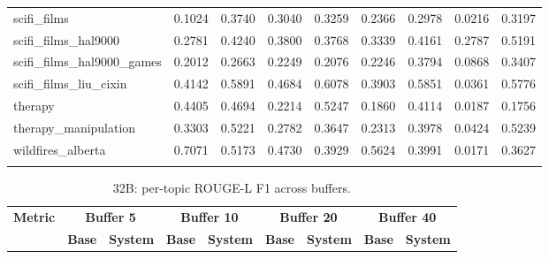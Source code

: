 \documentclass[pdflatex,sn-mathphys-num]{sn-jnl}%
\theoremstyle{thmstyleone}%
\theoremstyle{thmstyletwo}%
\theoremstyle{thmstylethree}%
\begin{document}
\begin{appendices}
\begin{landscape}
\begin{longtable}{@{}p{3.8cm}cccccccc@{}}
scifi\_films & 0.1024 & 0.3740 & 0.3040 & 0.3259 & 0.2366 & 0.2978 & 0.0216 & 0.3197 \\
scifi\_films\_hal9000 & 0.2781 & 0.4240 & 0.3800 & 0.3768 & 0.3339 & 0.4161 & 0.2787 & 0.5191 \\
scifi\_films\_hal9000\_games & 0.2012 & 0.2663 & 0.2249 & 0.2076 & 0.2246 & 0.3794 & 0.0868 & 0.3407 \\
scifi\_films\_liu\_cixin & 0.4142 & 0.5891 & 0.4684 & 0.6078 & 0.3903 & 0.5851 & 0.0361 & 0.5776 \\
therapy & 0.4405 & 0.4694 & 0.2214 & 0.5247 & 0.1860 & 0.4114 & 0.0187 & 0.1756 \\
therapy\_manipulation & 0.3303 & 0.5221 & 0.2782 & 0.3647 & 0.2313 & 0.3978 & 0.0424 & 0.5239 \\
wildfires\_alberta & 0.7071 & 0.5173 & 0.4730 & 0.3929 & 0.5624 & 0.3991 & 0.0171 & 0.3627 \\
\botrule
\end{longtable}
\normalsize
\end{landscape}
\begin{landscape}
\tiny
\begin{longtable}{@{}p{3.8cm}cccccccc@{}}
\caption{32B: per-topic ROUGE-L F1 across buffers.}\label{tab:app_32b_rougel_topics}\\

\toprule
\textbf{Metric} & \multicolumn{2}{c}{\textbf{Buffer 5}} & \multicolumn{2}{c}{\textbf{Buffer 10}} & \multicolumn{2}{c}{\textbf{Buffer 20}} & \multicolumn{2}{c}{\textbf{Buffer 40}} \\
\cmidrule(lr){2-3}\cmidrule(lr){4-5}\cmidrule(lr){6-7}\cmidrule(lr){8-9}
 & \textbf{Base} & \textbf{System} & \textbf{Base} & \textbf{System} & \textbf{Base} & \textbf{System} & \textbf{Base} & \textbf{System} \\
\midrule
\endfirsthead


\end{longtable}
\end{landscape}
\end{appendices}
\end{document}
